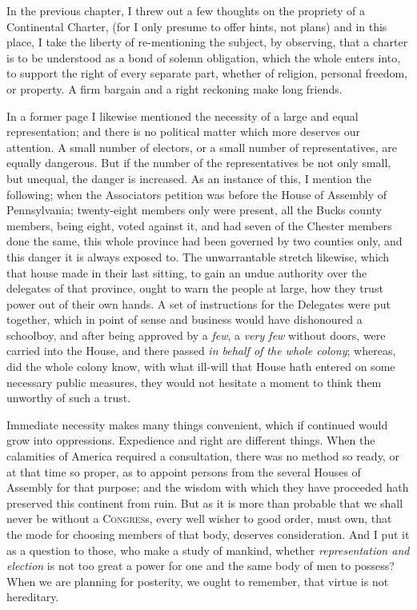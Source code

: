 \documentclass[12pt, twocolumn]{book}
\begin{document}
    In the previous chapter, I threw out a few thoughts on the propriety of a Continental Charter, (for I only presume to offer hints, not plans) and in this place, I take the liberty of re-mentioning the subject, by observing, that a charter is to be understood as a bond of solemn obligation, which the whole enters into, to support the right of every separate part, whether of religion, personal freedom, or property. A firm bargain and a right reckoning make long friends.

    In a former page I likewise mentioned the necessity of a large and equal representation; and there is no political matter which more deserves our attention. A small number of electors, or a small number of representatives, are equally dangerous. But if the number of the representatives be not only small, but unequal, the danger is increased. As an instance of this, I mention the following; when the Associators petition was before the House of Assembly of Pennsylvania; twenty-eight members only were present, all the Bucks county members, being eight, voted against it, and had seven of the Chester members done the same, this whole province had been governed by two counties only, and this danger it is always exposed to. The unwarrantable stretch likewise, which that house made in their last sitting, to gain an undue authority over the delegates of that province, ought to warn the people at large, how they trust power out of their own hands. A set of instructions for the Delegates were put together, which in point of sense and business would have dishonoured a schoolboy, and after being approved by a \textit{few}, a \textit{very few} without doors, were carried into the House, and there passed \textit{in behalf of the whole colony}; whereas, did the whole colony know, with what ill-will that House hath entered on some necessary public measures, they would not hesitate a moment to think them unworthy of such a trust.

    Immediate necessity makes many things convenient, which if continued would grow into oppressions. Expedience and right are different things. When the calamities of America required a consultation, there was no method so ready, or at that time so proper, as to appoint persons from the several Houses of Assembly for that purpose; and the wisdom with which they have proceeded hath preserved this continent from ruin. But as it is more than probable that we shall never be without a \textsc{Congres}s, every well wisher to good order, must own, that the mode for choosing members of that body, deserves consideration. And I put it as a question to those, who make a study of mankind, whether \textit{representation and election} is not too great a power for one and the same body of men to possess? When we are planning for posterity, we ought to remember, that virtue is not hereditary.
\end{document}
